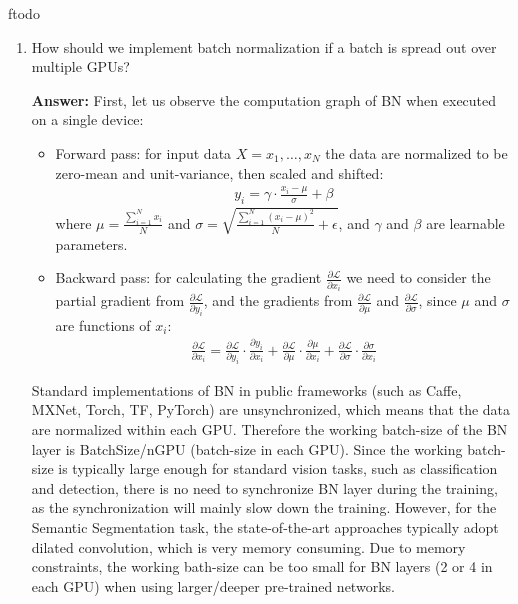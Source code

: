 ƒtodo\documentclass{article}
\newenvironment{QandA}{\begin{enumerate}[label=\arabic*.]}{\end{enumerate}}
\newenvironment{answer}{\par\normalfont \textbf{Answer:}}{}
\begin{document}
\begin{QandA}
    \item How should we implement batch normalization if a batch is spread out over multiple GPUs?
    \begin{answer}
        First, let us observe the computation graph of BN when executed on a single device:
        \begin{itemize}
            \item Forward pass: for input data $X = x_1, \ldots, x_N$ the data are normalized to be zero-mean and unit-variance, then scaled and shifted:
            \begin{align*}
                y_i = \gamma \cdot \frac{x_i - \mu}{\sigma} + \beta
            \end{align*}
            where $\mu = \frac{\sum_{i=1}^N x_i}{N}$ and $\sigma = \sqrt{\frac{\sum_{i=1}^N (x_i - \mu)^2}{N} + \epsilon}$, and $\gamma$ and $\beta$ are learnable parameters. 
            \item Backward pass: for calculating the gradient $\frac{\partial \mathcal{L}}{\partial x_i}$ we need to consider the partial gradient from $\frac{\partial \mathcal{L}}{\partial y_i}$, and the gradients from $\frac{\partial \mathcal{L}}{\partial \mu}$ and $\frac{\partial \mathcal{L}}{\partial \sigma}$, since $\mu$ and $\sigma$ are functions of $x_i$:
            \begin{align*}
                \frac{\partial \mathcal{L}}{\partial x_i} = \frac{\partial \mathcal{L}}{\partial y_i} \cdot \frac{\partial y_i}{\partial x_i} + \frac{\partial \mathcal{L}}{\partial \mu} \cdot \frac{\partial \mu}{\partial x_i} + \frac{\partial \mathcal{L}}{\partial \sigma} \cdot \frac{\partial \sigma}{\partial x_i}
            \end{align*}
        \end{itemize}
        Standard implementations of BN in public frameworks (such as Caffe, MXNet, Torch, TF, PyTorch) are unsynchronized, which means that the data are normalized within each GPU. Therefore the working batch-size of the BN layer is BatchSize/nGPU (batch-size in each GPU). Since the working batch-size is typically large enough for standard vision tasks, such as classification and detection, there is no need to synchronize BN layer during the training, as the synchronization will mainly slow down the training. However, for the Semantic Segmentation task, the state-of-the-art approaches typically adopt dilated convolution, which is very memory consuming. Due to memory constraints, the working bath-size can be too small for BN layers (2 or 4 in each GPU) when using larger/deeper pre-trained networks.\\\\

\end{answer}
\end{QandA}
\end{document}
